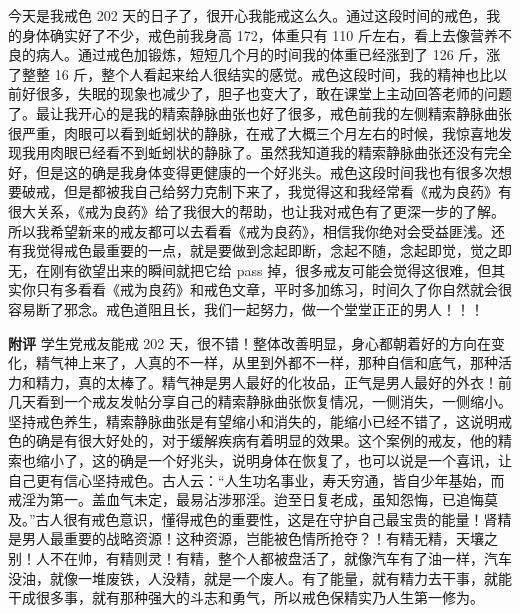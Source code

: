 \begin{case}
    今天是我戒色 202 天的日子了，很开心我能戒这么久。通过这段时间的戒色，我的身体确实好了不少，戒色前我身高 172，体重只有 110 斤左右，看上去像营养不良的病人。通过戒色加锻炼，短短几个月的时间我的体重已经涨到了 126 斤，涨了整整 16 斤，整个人看起来给人很结实的感觉。戒色这段时间，我的精神也比以前好很多，失眠的现象也减少了，胆子也变大了，敢在课堂上主动回答老师的问题了。最让我开心的是我的精索静脉曲张也好了很多，戒色前我的左侧精索静脉曲张很严重，肉眼可以看到蚯蚓状的静脉，在戒了大概三个月左右的时候，我惊喜地发现我用肉眼已经看不到蚯蚓状的静脉了。虽然我知道我的精索静脉曲张还没有完全好，但是这的确是我身体变得更健康的一个好兆头。戒色这段时间我也有很多次想要破戒，但是都被我自己给努力克制下来了，我觉得这和我经常看《戒为良药》有很大关系，《戒为良药》给了我很大的帮助，也让我对戒色有了更深一步的了解。所以我希望新来的戒友都可以去看看《戒为良药》，相信我你绝对会受益匪浅。还有我觉得戒色最重要的一点，就是要做到念起即断，念起不随，念起即觉，觉之即无，在刚有欲望出来的瞬间就把它给 pass 掉，很多戒友可能会觉得这很难，但其实你只有多看看《戒为良药》和戒色文章，平时多加练习，时间久了你自然就会很容易断了邪念。戒色道阻且长，我们一起努力，做一个堂堂正正的男人！！！

    \textbf{附评} 学生党戒友能戒 202 天，很不错！整体改善明显，身心都朝着好的方向在变化，精气神上来了，人真的不一样，从里到外都不一样，那种自信和底气，那种活力和精力，真的太棒了。精气神是男人最好的化妆品，正气是男人最好的外衣！前几天看到一个戒友发帖分享自己的精索静脉曲张恢复情况，一侧消失，一侧缩小。坚持戒色养生，精索静脉曲张是有望缩小和消失的，能缩小已经不错了，这说明戒色的确是有很大好处的，对于缓解疾病有着明显的效果。这个案例的戒友，他的精索也缩小了，这的确是一个好兆头，说明身体在恢复了，也可以说是一个喜讯，让自己更有信心坚持戒色。古人云：“人生功名事业，寿夭穷通，皆自少年基始，而戒淫为第一。盖血气未定，最易沾涉邪淫。迨至日复老成，虽知怨悔，已追悔莫及。”古人很有戒色意识，懂得戒色的重要性，这是在守护自己最宝贵的能量！肾精是男人最重要的战略资源！这种资源，岂能被色情所抢夺？！有精无精，天壤之别！人不在帅，有精则灵！有精，整个人都被盘活了，就像汽车有了油一样，汽车没油，就像一堆废铁，人没精，就是一个废人。有了能量，就有精力去干事，就能干成很多事，就有那种强大的斗志和勇气，所以戒色保精实乃人生第一修为。
\end{case}

